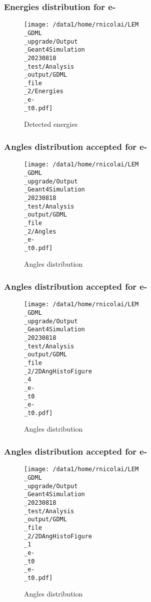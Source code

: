 \documentclass[8pt]{beamer}
\begin{document}
            \begin{frame}
                \frametitle{Energies distribution for e-}
            
        \begin{figure}[h]
            \centering
            \texttt{[image: /data1/home/rnicolai/LEM\\\_GDML\\\_upgrade/Output\\\_Geant4Simulation\\\_20230818\\\_test/Analysis\\\_output/GDML\\\_file\\\_2/Energies\\\_e-\\\_t0.pdf]}
            \caption{Detected energies}
        \end{figure}
        
            \end{frame}
            
            \begin{frame}
                \frametitle{Angles distribution accepted for e-}
            
        \begin{figure}[h]
            \centering
            \texttt{[image: /data1/home/rnicolai/LEM\\\_GDML\\\_upgrade/Output\\\_Geant4Simulation\\\_20230818\\\_test/Analysis\\\_output/GDML\\\_file\\\_2/Angles\\\_e-\\\_t0.pdf]}
            \caption{Angles distribution}
        \end{figure}
        
            \end{frame}
            
            \begin{frame}
                \frametitle{Angles distribution accepted for e-}
            
        \begin{figure}[h]
            \centering
            \texttt{[image: /data1/home/rnicolai/LEM\\\_GDML\\\_upgrade/Output\\\_Geant4Simulation\\\_20230818\\\_test/Analysis\\\_output/GDML\\\_file\\\_2/2DAngHistoFigure\\\_4\\\_e-\\\_t0\\\_e-\\\_t0.pdf]}
            \caption{Angles distribution}
        \end{figure}
        
            \end{frame}
            
            \begin{frame}
                \frametitle{Angles distribution accepted for e-}
            
        \begin{figure}[h]
            \centering
            \texttt{[image: /data1/home/rnicolai/LEM\\\_GDML\\\_upgrade/Output\\\_Geant4Simulation\\\_20230818\\\_test/Analysis\\\_output/GDML\\\_file\\\_2/2DAngHistoFigure\\\_1\\\_e-\\\_t0\\\_e-\\\_t0.pdf]}
            \caption{Angles distribution}
        \end{figure}
        
            \end{frame}
            
\end{document}
